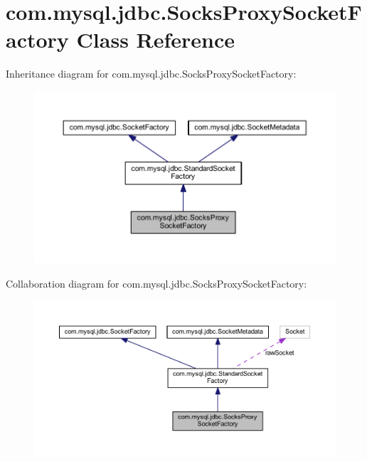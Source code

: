 \hypertarget{classcom_1_1mysql_1_1jdbc_1_1_socks_proxy_socket_factory}{}\section{com.\+mysql.\+jdbc.\+Socks\+Proxy\+Socket\+Factory Class Reference}
\label{classcom_1_1mysql_1_1jdbc_1_1_socks_proxy_socket_factory}


Inheritance diagram for com.\+mysql.\+jdbc.\+Socks\+Proxy\+Socket\+Factory\+:
\nopagebreak
\begin{figure}[H]
\begin{center}
\leavevmode
\includegraphics[width=350pt]{classcom_1_1mysql_1_1jdbc_1_1_socks_proxy_socket_factory__inherit__graph}
\end{center}
\end{figure}


Collaboration diagram for com.\+mysql.\+jdbc.\+Socks\+Proxy\+Socket\+Factory\+:
\nopagebreak
\begin{figure}[H]
\begin{center}
\leavevmode
\includegraphics[width=350pt]{classcom_1_1mysql_1_1jdbc_1_1_socks_proxy_socket_factory__coll__graph}
\end{center}
\end{figure}
